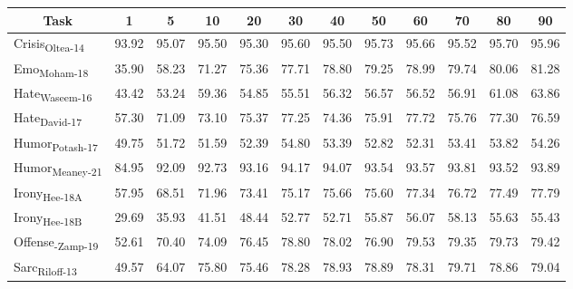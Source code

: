 \begin{table*}[ht]
\small
\centering
\begin{tabular}{@{}lccccccccccc@{}}
\toprule
\multicolumn{1}{c}{\textbf{Task}}                & \textbf{1} & \textbf{5} & \textbf{10} & \textbf{20} & \textbf{30} & \textbf{40} & \textbf{50} & \textbf{60} & \textbf{70} & \textbf{80} & \textbf{90} \\ \midrule
Crisis\textsubscript{Oltea-14}  & 93.92      & 95.07      & 95.50       & 95.30       & 95.60       & 95.50       & 95.73       & 95.66       & 95.52       & 95.70       & 95.96       \\
Emo\textsubscript{Moham-18}     & 35.90      & 58.23      & 71.27       & 75.36       & 77.71       & 78.80       & 79.25       & 78.99       & 79.74       & 80.06       & 81.28       \\
Hate\textsubscript{Waseem-16}   & 43.42      & 53.24      & 59.36       & 54.85       & 55.51       & 56.32       & 56.57       & 56.52       & 56.91       & 61.08       & 63.86       \\
Hate\textsubscript{David-17}    & 57.30      & 71.09      & 73.10       & 75.37       & 77.25       & 74.36       & 75.91       & 77.72       & 75.76       & 77.30       & 76.59       \\
Humor\textsubscript{Potash-17}  & 49.75      & 51.72      & 51.59       & 52.39       & 54.80       & 53.39       & 52.82       & 52.31       & 53.41       & 53.82       & 54.26       \\
Humor\textsubscript{Meaney-21}  & 84.95      & 92.09      & 92.73       & 93.16       & 94.17       & 94.07       & 93.54       & 93.57       & 93.81       & 93.52       & 93.89       \\
Irony\textsubscript{Hee-18A}    & 57.95      & 68.51      & 71.96       & 73.41       & 75.17       & 75.66       & 75.60       & 77.34       & 76.72       & 77.49       & 77.79       \\
Irony\textsubscript{Hee-18B}    & 29.69      & 35.93      & 41.51       & 48.44       & 52.77       & 52.71       & 55.87       & 56.07       & 58.13       & 55.63       & 55.43       \\
Offense\textsubscript{-Zamp-19} & 52.61      & 70.40      & 74.09       & 76.45       & 78.80       & 78.02       & 76.90       & 79.53       & 79.35       & 79.73       & 79.42       \\
Sarc\textsubscript{Riloff-13}   & 49.57      & 64.07      & 75.80       & 75.46       & 78.28       & 78.93       & 78.89       & 78.31       & 79.71       & 78.86       & 79.04       \\

\end{tabular}
\end{table*}
